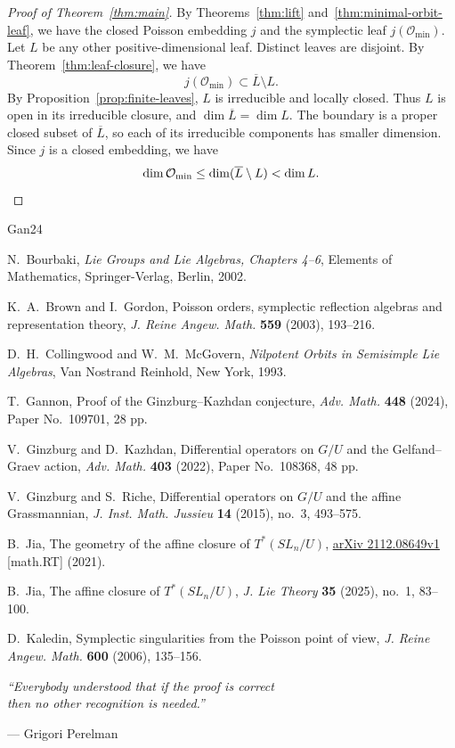 \documentclass[12pt]{article}
\theoremstyle{paperplain}
\theoremstyle{paperdefinition}
\newcommand{\Omin}{\mathcal O_{\min}}
\begin{document}
\begin{proof}[Proof of Theorem~\ref{thm:main}]
    By Theorems~\ref{thm:lift} and~\ref{thm:minimal-orbit-leaf}, we have the closed Poisson embedding $j$ and the symplectic leaf $j(\Omin)$. Let $L$ be any other positive-dimensional leaf. Distinct leaves are disjoint. By Theorem~\ref{thm:leaf-closure}, we have
    $$
        j(\Omin)\subset\overline L\setminus L.
    $$
    By Proposition~\ref{prop:finite-leaves}, $L$ is irreducible and locally closed. Thus $L$ is open in its irreducible closure, and $\dim\overline L=\dim L$. The boundary is a proper closed subset of $\overline L$, so each of its irreducible components has smaller dimension. Since $j$ is a closed embedding, we have
    \[
        \dim\Omin\le\dim(\overline L\setminus L)<\dim L.\qedhere
    \]
\end{proof}

\begin{thebibliography}{Gan24}
    \setlength{\itemsep}{0pt}
    \setlength{\parsep}{0pt}
    \setlength{\parskip}{0pt}

    N.~Bourbaki, \emph{Lie Groups and Lie Algebras, Chapters 4--6}, Elements of Mathematics, Springer-Verlag, Berlin, 2002.

    K.~A.~Brown and I.~Gordon, Poisson orders, symplectic reflection algebras and representation theory, \emph{J. Reine Angew. Math.} \textbf{559} (2003), 193--216.

    D.~H.~Collingwood and W.~M.~McGovern, \emph{Nilpotent Orbits in Semisimple Lie Algebras}, Van Nostrand Reinhold, New York, 1993.

    T.~Gannon, Proof of the Ginzburg--Kazhdan conjecture, \emph{Adv. Math.} \textbf{448} (2024), Paper No.~109701, 28 pp.

    V.~Ginzburg and D.~Kazhdan, Differential operators on $G/U$ and the Gelfand--Graev action, \emph{Adv. Math.} \textbf{403} (2022), Paper No.~108368, 48 pp.

    V.~Ginzburg and S.~Riche, Differential operators on $G/U$ and the affine Grassmannian, \emph{J. Inst. Math. Jussieu} \textbf{14} (2015), no.~3, 493--575.

    B.~Jia, The geometry of the affine closure of $T^*(SL_n/U)$, \href{https://arxiv.org/abs/2112.08649v1}{arXiv 2112.08649v1} [math.RT] (2021).

    B.~Jia, The affine closure of $T^*(SL_n/U)$, \emph{J. Lie Theory} \textbf{35} (2025), no.~1, 83--100.

    D.~Kaledin, Symplectic singularities from the Poisson point of view, \emph{J. Reine Angew. Math.} \textbf{600} (2006), 135--156.
\end{thebibliography}

\vfill
\noindent\hfill\begin{minipage}{350bp}
    \raggedleft\itshape
    ``Everybody understood that if the proof is correct\\
    then no other recognition is needed.''
    \par\vspace{0.25em}
    {\upshape --- Grigori Perelman}
\end{minipage}
\end{document}
